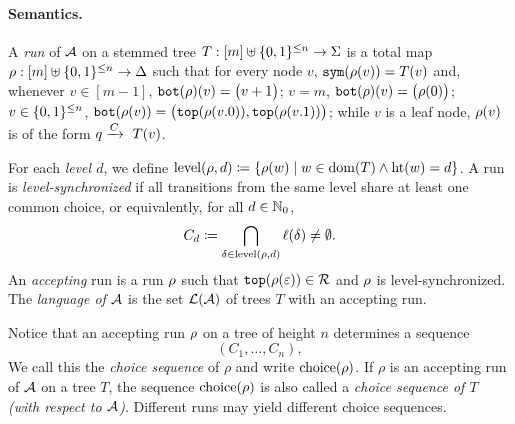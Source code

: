 \documentclass{article}
\begin{document}
\paragraph{Semantics.} 
A \emph{run} of $\mathcal{A}$ on a stemmed tree $T: [m] \uplus  \{0,1\}^{\le n} \to \Sigma$ is a total map $\rho : [m] \uplus \{0,1\}^{\le n} \to \Delta$ such that for every node $v$, $\mathtt{sym}(\rho(v)) = T(v)$ and, whenever 
$v \in [m-1]$, $\mathtt{bot}(\rho)(v) = \bigl(v+1 \bigr)$;
$v = m$, $\mathtt{bot}(\rho)(v) = \bigl( \rho(0) \big)$;
$v \in \{0,1\}^{\le n}$,
$\mathtt{bot}(\rho(v))=\bigl(\mathtt{top}(\rho(v.0)), \mathtt{top}(\rho(v.1))\bigr)$; while $v$ is a leaf node, $\rho(v)$ is of the form ${q}\xrightarrow{C}~{T(v)}$.

For each \emph{level $d$}, we define %
$\mathrm{level}(\rho,d) \coloneq \{ \rho(w) \mid w \in \mathrm{dom}(T) \land \mathrm{ht}(w) = d\}$.
A run is \emph{level-synchronized} if all transitions from the same level share at least one common choice, or equivalently, for all $d \in \mathbb{N}_{0}$, 
\[C_d \coloneq \bigcap_{\delta \in \mathrm{level}(\rho,d)} \ell(\delta) \neq \emptyset.\] 
An \emph{accepting} run is a run $\rho$ such that $\mathtt{top}(\rho(\varepsilon)) \in \mathcal{R}$ and $\rho$ is level-synchronized.
The \emph{language of $\mathcal{A}$} is the set $\mathcal{L}(\mathcal{A})$ of trees $T$ with an accepting run. 

Notice that an accepting run $\rho$ on a tree of height $n$ determines a sequence
\[
(C_1,\dots,C_n),
\]
We call this the \emph{choice sequence} of $\rho$ and write $\mathrm{choice}(\rho)$. 
If $\rho$ is an accepting run of $\mathcal{A}$ on a tree $T$,
the sequence $\mathrm{choice}(\rho)$ is also called a \emph{choice sequence of $T$ (with respect to $\mathcal{A}$)}.
Different runs may yield different choice sequences.

\end{document}
